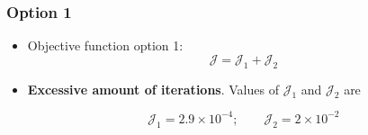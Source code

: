 \begin{frame}
\begin{itemize}
	

\end{itemize}		
	
	
	
\end{frame}



\begin{frame}
	\frametitle[]{Option 1  \hspace{8cm}}
	\footnotesize
	
	\vspace{-3mm}
	
	\begin{itemize}
		\item Objective function option 1:
	\begin{equation*}
		\boxed{\mathcal{J}  =  \mathcal{J}_1 + 
\mathcal{J}_2}
	\end{equation*}
	
	
	\begin{center}
		
	\end{center}				

\item \textcolor[rgb]{1.0,0.0,0.0}{\textbf{Excessive amount of iterations}}. Values of $\mathcal{J}_1$	and $\mathcal{J}_2$ are

\begin{equation*}
	\mathcal{J}_1  =  2.9\times 10^{-4};\qquad \mathcal{J}_2=2\times 10^{-2}
\end{equation*}

	\end{itemize}		

	
\end{frame}


